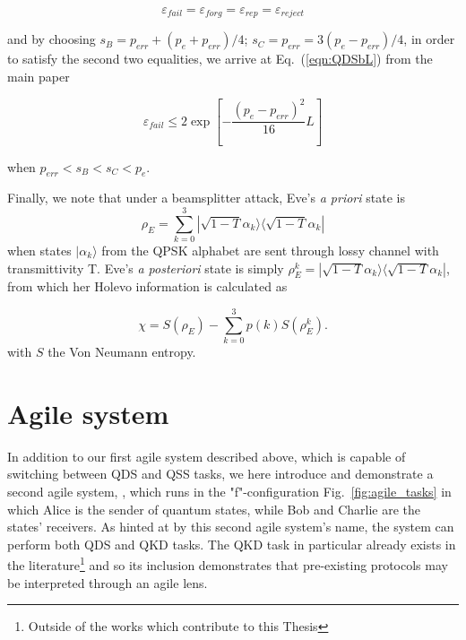 \begin{equation*}
\varepsilon_{fail} = \varepsilon_{forg} = \varepsilon_{rep} = \varepsilon_{reject}
\end{equation*}

\noindent and by choosing $s_B = p_{err} + \left(p_e + p_{err}\right)/4$; $s_C = p_{err} = 3\left(p_e - p_{err}\right)/4$, in order to satisfy the second two equalities, we arrive at Eq.~(\ref{eqn:QDSbL}) from the main paper

\begin{equation}
\varepsilon_{fail} \le 2 \exp \left[ - \frac{\left( p_e - p_{err} \right)^2}{16} L \right]
\end{equation}

\noindent when $p_{err} < s_B < s_C < p_e$.

Finally, we note that under a beamsplitter attack, Eve's \emph{a priori} state is
\begin{equation}
\rho_E = \sum_{k=0}^3 |\sqrt{1-T}\alpha_k\rangle\langle\sqrt{1-T}\alpha_k|
\end{equation}
when states $|\alpha_k\rangle$ from the QPSK alphabet are sent through lossy channel with transmittivity T. Eve's \emph{a posteriori} state is simply $\rho_{E}^k = |\sqrt{1-T}\alpha_k\rangle\langle \sqrt{1-T}\alpha_k|$, from which her Holevo information is calculated as

\begin{equation}
\chi = S\left(\rho_E\right) - \sum_{k=0}^3 p\left(k\right) S\left(\rho_E^k\right).
\end{equation}
with $S$ the Von Neumann entropy.




\section{Agile system \systemF}

In addition to our first agile system described above, which is capable of switching between QDS and QSS tasks, we here introduce and demonstrate a second agile system, \systemF, which runs in the "f"-configuration Fig.~\ref{fig:agile_tasks} in which Alice is the sender of quantum states, while Bob and Charlie are the states' receivers. As hinted at by this second agile system's name, the system can perform both QDS and QKD tasks. The QKD task in particular already exists in the literature\footnote{Outside of the works which contribute to this Thesis} and so its inclusion demonstrates that pre-existing protocols may be interpreted through an agile lens.


